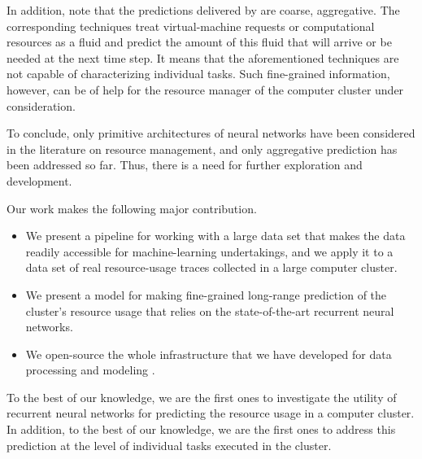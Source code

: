 In addition, note that the predictions delivered by \cite{dabbagh2015,
ismaeel2015, cao2014} are coarse, aggregative. The corresponding techniques
treat virtual-machine requests or computational resources as a fluid and predict
the amount of this fluid that will arrive or be needed at the next time step. It
means that the aforementioned techniques are not capable of characterizing
individual tasks. Such fine-grained information, however, can be of help for the
resource manager of the computer cluster under consideration.

To conclude, only primitive architectures of neural networks have been
considered in the literature on resource management, and only aggregative
prediction has been addressed so far. Thus, there is a need for further
exploration and development.

Our work makes the following major contribution.
\begin{itemize}
\item We present a pipeline for working with a large data set that makes the
data readily accessible for machine-learning undertakings, and we apply it to a
data set of real resource-usage traces collected in a large computer cluster.

\item We present a model for making fine-grained long-range prediction of the
cluster's resource usage that relies on the state-of-the-art recurrent neural
networks.

\item We open-source the whole infrastructure that we have developed for data
processing and modeling \cite{sources}.
\end{itemize}
To the best of our knowledge, we are the first ones to investigate the utility
of recurrent neural networks for predicting the resource usage in a computer
cluster. In addition, to the best of our knowledge, we are the first ones to
address this prediction at the level of individual tasks executed in the
cluster.
